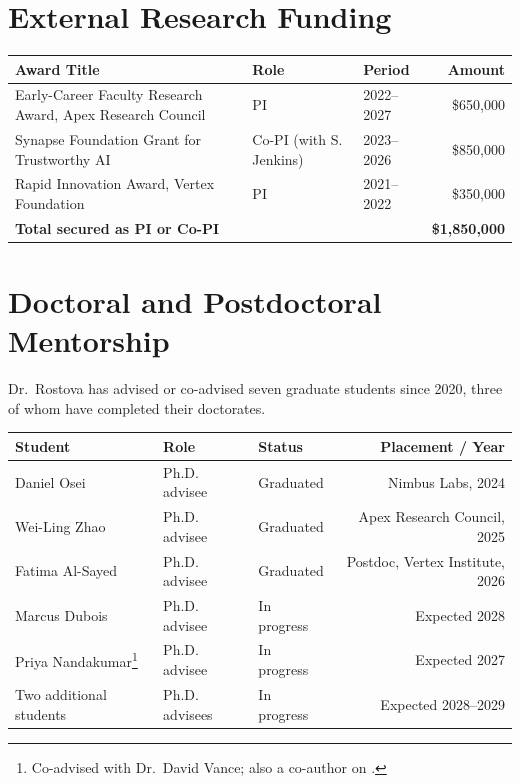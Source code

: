 \section{External Research Funding}
\begin{center}
\begin{tabularx}{\linewidth}{@{}Xllr@{}}
\toprule
\textbf{Award Title} & \textbf{Role} & \textbf{Period} & \textbf{Amount} \\
\midrule
Early-Career Faculty Research Award, Apex Research Council & PI & 2022--2027 & \$650{,}000 \\{}
Synapse Foundation Grant for Trustworthy AI & Co-PI (with S. Jenkins) & 2023--2026 & \$850{,}000 \\{}
Rapid Innovation Award, Vertex Foundation & PI & 2021--2022 & \$350{,}000 \\
\midrule
\textbf{Total secured as PI or Co-PI} & & & \textbf{\$1{,}850{,}000} \\
\bottomrule
\end{tabularx}
\end{center}

\section{Doctoral and Postdoctoral Mentorship}
Dr.\ Rostova has advised or co-advised seven graduate students since 2020, three of whom have completed their doctorates.

\begin{center}
\begin{tabularx}{\linewidth}{@{}Xllr@{}}
\toprule
\textbf{Student} & \textbf{Role} & \textbf{Status} & \textbf{Placement / Year} \\
\midrule
Daniel Osei & Ph.D. advisee & Graduated & Nimbus Labs, 2024 \\{}
Wei-Ling Zhao & Ph.D. advisee & Graduated & Apex Research Council, 2025 \\{}
Fatima Al-Sayed & Ph.D. advisee & Graduated & Postdoc, Vertex Institute, 2026 \\{}
Marcus Dubois & Ph.D. advisee & In progress & Expected 2028 \\{}
Priya Nandakumar\footnote{Co-advised with Dr.\ David Vance; also a co-author on \citep{rostova2025graphanomaly}.} & Ph.D. advisee & In progress & Expected 2027 \\{}
Two additional students & Ph.D. advisees & In progress & Expected 2028--2029 \\
\bottomrule
\end{tabularx}
\end{center}

